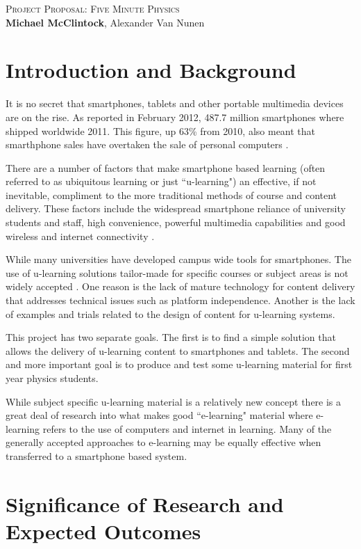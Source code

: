 \documentclass[12pt,a4paper]{article}  %
\begin{document}
\begin{center}
  \textsc{\Large Project Proposal: Five Minute Physics}
  \\[8mm]
  \textbf{Michael McClintock}, Alexander Van Nunen
\end{center}

\section*{Introduction and Background}

It is no secret that smartphones, tablets and other portable
multimedia devices are on the rise. As reported in February 2012,
487.7 million smartphones where shipped worldwide 2011.  This figure,
up 63\% from 2010, also meant that smarthphone sales have overtaken
the sale of personal computers \cite{canalys}. 

There are a number of factors that make smartphone based learning
(often referred to as ubiquitous learning or just ``u-learning") an
effective, if not inevitable, compliment to the more traditional
methods of course and content delivery. These factors include the
widespread smartphone reliance of university students and staff, high
convenience, powerful multimedia capabilities and good wireless and
internet connectivity \cite{worry}.

While many universities have developed campus wide tools for
smartphones. The use of u-learning solutions tailor-made for specific
courses or subject areas is not widely accepted \cite{procsmart}.
One reason is the lack of mature technology for content delivery that
addresses technical issues such as platform independence. Another is the
lack of examples and trials related to the design of content for
u-learning systems.

This project has two separate goals. The first is to find a simple
solution that allows the delivery of u-learning content to smartphones
and tablets. The second and more important goal is to produce and test
some u-learning material for first year physics students.

While subject specific u-learning material is a relatively new concept
there is a great deal of research into what makes good ``e-learning"
material where e-learning refers to the use of computers and internet
in learning. Many of the generally accepted approaches to e-learning
may be equally effective when transferred to a smartphone based
system.

\section*{Significance of Research and Expected Outcomes}
\end{document}
